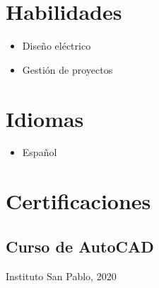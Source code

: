 \documentclass[11pt,a4paper]{article}
\begin{document}
\section*{Habilidades}
\begin{itemize}[leftmargin=*]
    \item Diseño eléctrico
    \item Gestión de proyectos
\end{itemize}

\section*{Idiomas}
\begin{itemize}[leftmargin=*]
    \item Español
\end{itemize}

\section*{Certificaciones}
\subsection*{Curso de AutoCAD}
Instituto San Pablo, 2020
\end{document}
